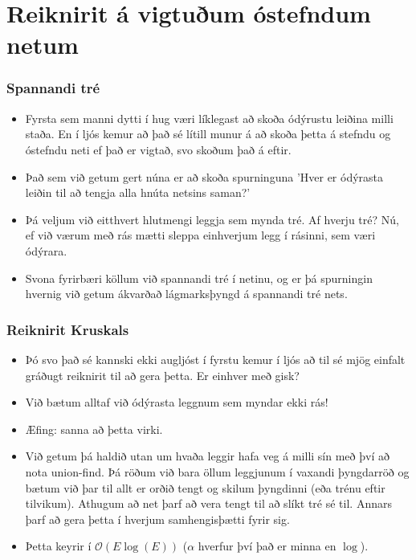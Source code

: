 \documentclass{beamer}
\begin{document}
\section[Reiknirit á vigtuðum óstefndum netum]{Reiknirit á vigtuðum óstefndum netum}

\begin{frame}
\frametitle{Spannandi tré}

\begin{itemize}

\item<1-> Fyrsta sem manni dytti í hug væri líklegast að skoða ódýrustu leiðina milli staða. En í ljós kemur að það sé lítill munur á að skoða þetta á stefndu og óstefndu neti ef það er vigtað, svo skoðum það á eftir.

\item<2-> Það sem við getum gert núna er að skoða spurninguna 'Hver er ódýrasta leiðin til að tengja alla hnúta netsins saman?'

\item<3-> Þá veljum við eitthvert hlutmengi leggja sem mynda tré. Af hverju tré? Nú, ef við værum með rás mætti sleppa einhverjum legg í rásinni, sem væri ódýrara.

\item<4-> Svona fyrirbæri köllum við spannandi tré í netinu, og er þá spurningin hvernig við getum ákvarðað lágmarksþyngd á spannandi tré nets.

\end{itemize}

\end{frame}

\begin{frame}
\frametitle{Reiknirit Kruskals}

\begin{itemize}

\item<1-> Þó svo það sé kannski ekki augljóst í fyrstu kemur í ljós að til sé mjög einfalt gráðugt reiknirit til að gera þetta. Er einhver með gisk?

\item<2-> Við bætum alltaf við ódýrasta leggnum sem myndar ekki rás! 

\item<3-> Æfing: sanna að þetta virki.

\item<4-> Við getum þá haldið utan um hvaða leggir hafa veg á milli sín með því að nota union-find. Þá röðum við bara öllum leggjunum í vaxandi þyngdarröð og bætum við þar til allt er orðið tengt og skilum þyngdinni (eða trénu eftir tilvikum). Athugum að net þarf að vera tengt til að slíkt tré sé til. Annars þarf að gera þetta í hverjum samhengisþætti fyrir sig.

\item<5-> Þetta keyrir í $\mathcal{O}(E\log(E))$ ($\alpha$ hverfur því það er minna en $\log$).

\end{itemize}

\end{frame}
\end{document}
